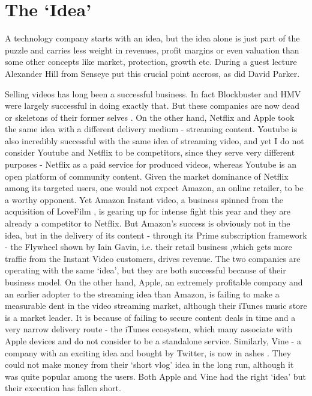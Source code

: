 \documentclass[twocolumn]{bmcart}%
\begin{document}

\section*{The `Idea'}
A technology company starts with an idea, but the idea alone is just part of the puzzle and carries less weight in revenues, profit margins or even valuation than some other concepts like market, protection, growth etc. During a guest lecture Alexander Hill from Senseye put this crucial point accross, as did David Parker.\\

\par Selling videos has long been a successful business. In fact Blockbuster and HMV were largely successful in doing exactly that. But these companies are now dead \cite{gavinjackson2013} or skeletons of their former selves \cite{markwembridgeclaerbarrett2011}. On the other hand, Netflix and Apple took the same idea with a different delivery medium - streaming content. Youtube is also incredibly successful with the same idea of streaming video, and yet I do not consider Youtube and Netflix to be competitors, since they serve very different purposes - Netflix as a paid service for produced videos, whereas Youtube is an open platform of community content. Given the market dominance of Netflix among its targeted users, one would not expect Amazon, an online retailer, to be a worthy opponent. Yet Amazon Instant video, a business spinned from the acquisition of LoveFilm \cite{timbradshaw2011}, is gearing up for intense fight this year \cite{madhumitamurgia2017} and they are already a competitor to Netflix. But Amazon's success is obviously not in the idea, but in the delivery of its content - through its Prime subscription framework - the Flywheel shown by Iain Gavin, i.e. their retail business ,which gets more traffic from the Instant Video customers, drives revenue. The two companies are operating with the same `idea', but they are both successful because of their business model. On the other hand, Apple, an extremely profitable company and an earlier adopter to the streaming idea than Amazon, is failing to make a measurable dent in the video streaming market, although their iTunes music store is a market leader. It is because of failing to secure content deals in time \cite{matthewgarrahan2017} and a very narrow delivery route - the iTunes ecosystem, which many associate with Apple devices and do not consider to be a standalone service. Similarly, Vine - a company with an exciting idea and bought by Twitter, is now in ashes \cite{chrisfoxx2016}. They could not make money from their `short vlog' idea in the long run, although it was quite popular among the users. Both Apple and Vine had the right `idea' but their execution has fallen short.\\
\end{document}
